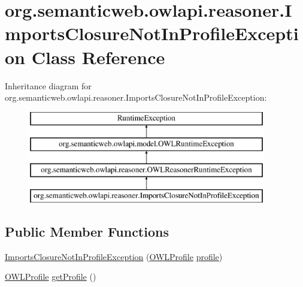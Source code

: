 \hypertarget{classorg_1_1semanticweb_1_1owlapi_1_1reasoner_1_1_imports_closure_not_in_profile_exception}{\section{org.\-semanticweb.\-owlapi.\-reasoner.\-Imports\-Closure\-Not\-In\-Profile\-Exception Class Reference}
\label{classorg_1_1semanticweb_1_1owlapi_1_1reasoner_1_1_imports_closure_not_in_profile_exception}
}
Inheritance diagram for org.\-semanticweb.\-owlapi.\-reasoner.\-Imports\-Closure\-Not\-In\-Profile\-Exception\-:\begin{figure}[H]
\begin{center}
\leavevmode
\includegraphics[height=4.000000cm]{classorg_1_1semanticweb_1_1owlapi_1_1reasoner_1_1_imports_closure_not_in_profile_exception}
\end{center}
\end{figure}
\subsection*{Public Member Functions}
\begin{DoxyCompactItemize}
\item 
\hyperlink{classorg_1_1semanticweb_1_1owlapi_1_1reasoner_1_1_imports_closure_not_in_profile_exception_ac7aeb913e0e80cdd5c9d10429a438104}{Imports\-Closure\-Not\-In\-Profile\-Exception} (\hyperlink{interfaceorg_1_1semanticweb_1_1owlapi_1_1profiles_1_1_o_w_l_profile}{O\-W\-L\-Profile} \hyperlink{classorg_1_1semanticweb_1_1owlapi_1_1reasoner_1_1_imports_closure_not_in_profile_exception_ab85e99cbbda0c387ab5ec4d853079f71}{profile})
\item 
\hyperlink{interfaceorg_1_1semanticweb_1_1owlapi_1_1profiles_1_1_o_w_l_profile}{O\-W\-L\-Profile} \hyperlink{classorg_1_1semanticweb_1_1owlapi_1_1reasoner_1_1_imports_closure_not_in_profile_exception_adcd3e37bebb1bf932034d5506b91fa93}{get\-Profile} ()
\end{DoxyCompactItemize}
